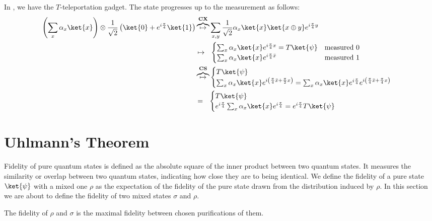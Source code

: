 \documentclass[12pt,a4paper]{article}
\begin{document}
In , we have the $T$-teleportation gadget. The state progresses up to the measurement as follows:
\begin{equation*}
    \begin{split}
        \left(\sum_{x}\alpha_{x}\ket{x}\right)\otimes\frac{1}{\sqrt{2}} \left(  \ket{0} + e^{i\frac{\pi}{4}}\ket{1}\right) & \overbrace{  \mapsto }^{ \textbf{CX} } \sum_{x,y}\frac{1}{\sqrt{2}}\alpha_{x}\ket{x}\ket{x\oplus y}e^{i\frac{\pi}{4} y} \\ 
        & \mapsto \ \ \begin{cases}
         \sum_{x}\alpha_x\ket{x}e^{i\frac{\pi}{4}x} = T\ket{\psi}   & \text{measured } 0 \\
           \sum_{x}\alpha_x\ket{x}e^{i\frac{\pi}{4}\bar{x}} & \text{measured } 1
        \end{cases} \\ 
        & \overbrace{  \mapsto }^{ \textbf{CS} } \begin{cases}
          T\ket{\psi}    \\
           \sum_{x}\alpha_x\ket{x}e^{i\left( \frac{\pi}{4}\bar{x} + \frac{\pi}{2}x \right)} =  \sum_{x}\alpha_x\ket{x}e^{i\frac{\pi}{4}}e^{i\left( \frac{\pi}{4}\bar{x} + \frac{\pi}{4}x \right)}
        \end{cases} \\ 
        & = \ \ \begin{cases}
          T\ket{\psi}    \\
           e^{i\frac{\pi}{4} } \sum_{x}\alpha_x\ket{x}e^{i\frac{\pi}{4}} = e^{i\frac{\pi}{4} } T\ket{\psi}
        \end{cases} 
    \end{split}
\end{equation*}


\section{Uhlmann's Theorem}
Fidelity of pure quantum states is defined as the absolute square of the inner product between two quantum states. It measures the similarity or overlap between two quantum states, indicating how close they are to being identical. We define the fidelity of a pure state $\ket{\psi}$ with a mixed one $\rho$ as the expectation of the fidelity of the pure state drawn from the distribution induced by $\rho$. In this section we are about to define the fidelity of two mixed states $\sigma$ and $\rho$.
\begin{definition}
The fidelity of $\rho$ and $\sigma$ is the maximal fidelity between chosen purifications of them.
\end{definition}
\end{document}
